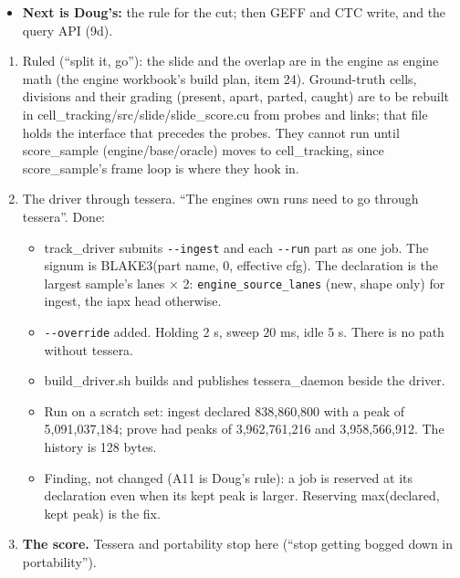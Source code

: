 \begin{itemize}
\begin{itemize}
\begin{itemize}
\item A just-divided pair separates only at levels where the parent is gone, or not at all.
\item One global drift misses daughters that move apart.
\item A division is found by a per-chain level (row 1's slide), with a per-body drift or climb in place of the frame's.
\end{itemize}
\item \textbf{Next is Doug's:} the rule for the cut; then GEFF and CTC write, and the query API (9d).
\end{itemize}
\end{itemize}

\begin{enumerate}
\item Ruled (“split it, go”): the slide and the overlap are in the engine as engine math (the engine workbook's build plan, item 24). Ground-truth cells, divisions and their grading (present, apart, parted, caught) are to be rebuilt in cell\_\allowbreak{}tracking/src/slide/slide\_\allowbreak{}score.cu from probes and links; that file holds the interface that precedes the probes. They cannot run until score\_\allowbreak{}sample (engine/base/oracle) moves to cell\_\allowbreak{}tracking, since score\_\allowbreak{}sample's frame loop is where they hook in.
\item The driver through tessera. “The engines own runs need to go through tessera”. Done:

\begin{itemize}
\item track\_\allowbreak{}driver submits \texttt{-\allowbreak{}-\allowbreak{}ingest} and each \texttt{-\allowbreak{}-\allowbreak{}run} part as one job. The signum is BLAKE3(part name, 0, effective cfg). The declaration is the largest sample's lanes × 2: \texttt{engine\_\allowbreak{}source\_\allowbreak{}lanes} (new, shape only) for ingest, the iapx head otherwise.
\item \texttt{-\allowbreak{}-\allowbreak{}override} added. Holding 2 s, sweep 20 ms, idle 5 s. There is no path without tessera.
\item build\_\allowbreak{}driver.sh builds and publishes tessera\_\allowbreak{}daemon beside the driver.
\item Run on a scratch set: ingest declared 838,860,800 with a peak of 5,091,037,184; prove had peaks of 3,962,761,216 and 3,958,566,912. The history is 128 bytes.
\item Finding, not changed (A11 is Doug's rule): a job is reserved at its declaration even when its kept peak is larger. Reserving max(declared, kept peak) is the fix.
\end{itemize}
\item \textbf{The score.} Tessera and portability stop here (“stop getting bogged down in portability”).


\end{enumerate}
